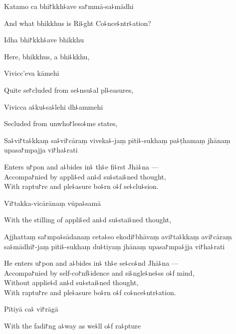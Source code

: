 Katamo ca bhi꜓kkh꜕ave sa꜓mmā-sa꜕mādhi

\begin{english}
  And what bhikkhus is Ri꜕ght Co꜕nce꜕ntr꜕ation?
\end{english}

Idha bhi꜓kkh꜕ave bhikkhu

\begin{english}
  Here, bhikkhus, a bhi꜕kkhu,
\end{english}

Vivicc'eva kāmehi

\begin{english}
  Quite se꜓cluded from se꜕nsu꜕al pl꜕easures,
\end{english}

Vivicca a꜕ku꜕sa꜕lehi dh꜕ammehi

\begin{english}
  Secluded from unwho꜓leso꜕me states,
\end{english}

Sa꜕vi꜓ta꜕kkaṃ sa꜕vi꜓cāraṃ viveka꜕-jaṃ pīti꜕-sukhaṃ pa꜕ṭhamaṃ jhānaṃ upasa꜓mpajja vi꜓ha꜕rati

\begin{english}
  Enters u꜓pon and a꜕bides in꜕ th꜕e fi꜕rst Jhā꜕na ---\\
  Accompa꜓nied by appli꜕ed an꜕d su꜕stai꜕ned thought,\\
  With raptu꜓re and ple꜕asure bo꜕rn o꜕f se꜕clu꜕sion.
\end{english}

Vi꜓takka-vicārānaṃ vūpa꜕samā

\begin{english}
  With the stilling of appli꜕ed an꜕d su꜕stai꜕ned thought,
\end{english}

Ajjhattaṃ sa꜓mpa꜕sādanaṃ ceta꜕so ekodi꜓bhāvaṃ avi꜓ta꜕kkaṃ avi꜓cāraṃ sa꜕mādhi꜓-jaṃ pīti꜕-sukhaṃ du꜕tiyaṃ jhānaṃ upasa꜓mpa꜕jja vi꜓ha꜕rati

\begin{english}
  He enters u꜓pon and a꜕bides in꜕ th꜕e se꜕co꜕nd Jhā꜕na ---\\
  Accompa꜓nied by self-co꜓nf꜕idence and si꜕ngle꜕ne꜕ss o꜕f mind,\\
  Without applie꜕d an꜕d su꜕stai꜕ned thought,\\
  With raptu꜓re and ple꜕asure bo꜕rn o꜕f co꜕nce꜕ntr꜕ation.
\end{english}

Pītiyā ca꜕ vi꜓rāgā

\begin{english}
  With the fadi꜓ng a꜕way as we꜕ll o꜕f ra꜕pture
\end{english}

